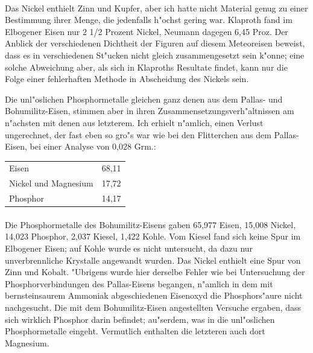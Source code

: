 \documentclass[a4paper, 11pt, oneside]{article}
\begin{document}
\paragraph{}
Das Nickel enthielt Zinn und Kupfer, aber ich hatte nicht Material genug zu einer Bestimmung ihrer Menge, die jedenfalls h"ochst gering war. Klaproth fand im Elbogener Eisen nur 2 1/2 Prozent Nickel, Neumann dagegen 6,45 Proz. Der Anblick der verschiedenen Dichtheit der Figuren auf diesem Meteoreisen beweist, dass es in verschiedenen St"ucken nicht gleich zusammengesetzt sein k"onne; eine solche Abweichung aber, als sich in Klaproths Resultate findet, kann nur die Folge einer fehlerhaften Methode in Abscheidung des Nickels sein.

Die unl"oslichen Phosphormetalle gleichen ganz denen aus dem Pallas- und Bohumilitz-Eisen, stimmen aber in ihren Zusammensetzungsverh"altnissen am n"achsten mit denen aus letzterem. Ich erhielt n"amlich, einen Verlust ungerechnet, der fast eben so gro"s war wie bei den Flitterchen aus dem Pallas-Eisen, bei einer Analyse von 0,028 Grm.:
\begin{center}
\begin{tabular}{ l r }
    Eisen & 68,11\\
    Nickel und Magnesium & 17,72\\
    Phosphor & 14,17\\
\end{tabular}
\end{center}
\paragraph{}
Die Phosphormetalle des Bohumilitz-Eisens gaben 65,977 Eisen, 15,008 Nickel, 14,023 Phosphor, 2,037 Kiesel, 1,422 Kohle. Vom Kiesel fand sich keine Spur im Elbogener Eisen; auf Kohle wurde es nicht untersucht, da dazu nur unverbrennliche Krystalle angewandt wurden. Das Nickel enthielt eine Spur von Zinn und Kobalt. "Ubrigens wurde hier derselbe Fehler wie bei Untersuchung der Phosphorverbindungen des Pallas-Eisens begangen, n"amlich in dem mit bernsteinsaurem Ammoniak abgeschiedenen Eisenoxyd die Phosphors"aure nicht nachgesucht. Die mit dem Bohumilitz-Eisen angestellten Versuche ergaben, dass sich wirklich Phosphor darin befindet; au"serdem, was in die unl"oslichen Phosphormetalle eingeht. Vermutlich enthalten die letzteren auch dort Magnesium.
\end{document}
